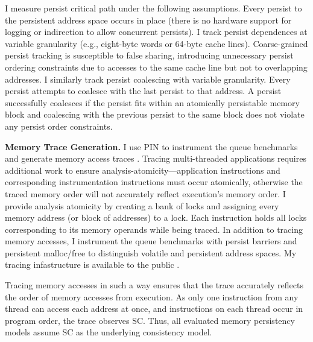 I measure persist critical path under the following assumptions.
Every persist to the persistent address space occurs in place (there is no hardware support for logging or indirection to allow concurrent persists).
I track persist dependences at variable granularity (e.g., eight-byte words or 64-byte cache lines).
Coarse-grained persist tracking is susceptible to false sharing, introducing unnecessary persist ordering constraints due to accesses to the same cache line but not to overlapping addresses.
I similarly track persist coalescing with variable granularity.
Every persist attempts to coalesce with the last persist to that address.
A persist successfully coalesces if the persist fits within an atomically persistable memory block and coalescing with the previous persist to the same block does not violate any persist order constraints.

\textbf{Memory Trace Generation.}
I use PIN to instrument the queue benchmarks and generate memory access traces \cite{LukCohn05}.
Tracing multi-threaded applications requires additional work to ensure analysis-atomicity---application instructions and corresponding instrumentation instructions must occur atomically, otherwise the traced memory order will not accurately reflect execution's memory order.
I provide analysis atomicity by creating a bank of locks and assigning every memory address (or block of addresses) to a lock.
Each instruction holds all locks corresponding to its memory operands while being traced.
In addition to tracing memory accesses, I instrument the queue benchmarks with persist barriers and persistent malloc/free to distinguish volatile and persistent address spaces.
My tracing infastructure is available to the public .

Tracing memory accesses in such a way ensures that the trace accurately reflects the order of memory accesses from execution.
As only one instruction from any thread can access each address at once, and instructions on each thread occur in program order, the trace observes SC.
Thus, all evaluated memory persistency models assume SC as the underlying consistency model.

